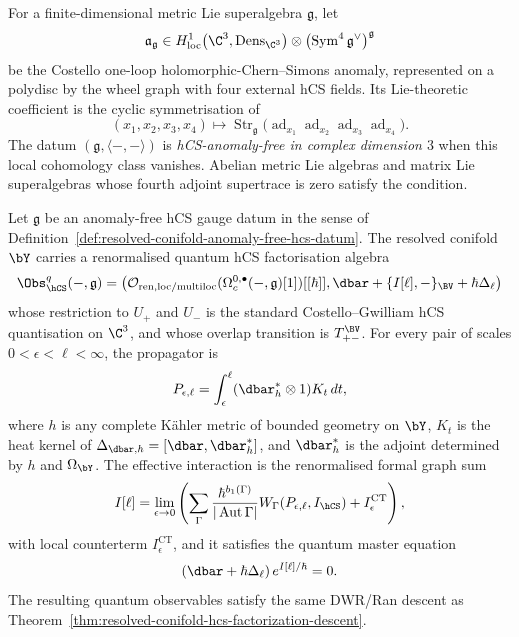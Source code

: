 \begin{definition}
\label{def:resolved-conifold-anomaly-free-hcs-datum}
For a finite-dimensional metric Lie superalgebra \(\mathfrak g\), let
\[
 \mathfrak a_{\mathfrak g}\in
 H^1_{\mathrm{loc}}\!\left(\C^3,
 \mathrm{Dens}_{\C^3}\right)
 \otimes
 \left(\operatorname{Sym}^4\mathfrak g^\vee\right)^{\mathfrak g}
\]
be the Costello one-loop holomorphic-Chern--Simons anomaly, represented
on a polydisc by the wheel graph with four external hCS fields.  Its
Lie-theoretic coefficient is the cyclic symmetrisation of
\[
 (x_1,x_2,x_3,x_4)
 \longmapsto
 \operatorname{Str}_{\mathfrak g}
 \bigl(\operatorname{ad}_{x_1}\operatorname{ad}_{x_2}
       \operatorname{ad}_{x_3}\operatorname{ad}_{x_4}\bigr).
\]
The datum \((\mathfrak g,\langle-,-\rangle)\) is
\emph{hCS-anomaly-free in complex dimension \(3\)} when this local
cohomology class vanishes.  Abelian metric Lie algebras and matrix Lie
superalgebras whose fourth adjoint supertrace is zero satisfy the
condition.
\end{definition}

\begin{theorem}
\label{thm:resolved-conifold-quantum-hcs-descent}
Let \(\mathfrak g\) be an anomaly-free hCS gauge datum in the sense of
Definition~\ref{def:resolved-conifold-anomaly-free-hcs-datum}.  The
resolved conifold \(\bY\) carries a renormalised quantum hCS
factorisation algebra
\[
 \Obs_{\hCS}^{q}(-,\mathfrak g)
 =
 \left(
 \mathcal O_{\mathrm{ren,loc/multiloc}}
   (\Omega_c^{0,\bullet}(-,\mathfrak g)[1])[[\hbar]],
 \dbar+\{I[\ell],-\}_{\BV}+\hbar\Delta_\ell
 \right)
\]
whose restriction to \(U_+\) and \(U_-\) is the standard
Costello--Gwilliam hCS quantisation on \(\C^3\), and whose overlap
transition is \(T_{+-}^{\BV}\).  For every pair of scales
\(0<\epsilon<\ell<\infty\), the propagator is
\[
 P_{\epsilon,\ell}
 =
 \int_\epsilon^\ell
 (\dbar^{*}_{h}\otimes 1)K_t\,dt,
\]
where \(h\) is any complete K\"ahler metric of bounded geometry on
\(\bY\), \(K_t\) is the heat kernel of
\(\Delta_{\dbar,h}=[\dbar,\dbar_h^*]\), and \(\dbar_h^*\) is the
adjoint determined by \(h\) and \(\Omega_{\bY}\).  The effective
interaction is the renormalised formal graph sum
\[
 I[\ell]
 =
 \lim_{\epsilon\to0}
 \left(
 \sum_{\Gamma}
 \frac{\hbar^{b_1(\Gamma)}}{|\operatorname{Aut}\Gamma|}
 W_\Gamma(P_{\epsilon,\ell},I_{\hCS})
 + I^{\mathrm{CT}}_{\epsilon}
 \right),
\]
with local counterterm \(I^{\mathrm{CT}}_{\epsilon}\), and it satisfies
the quantum master equation
\[
 \left(\dbar+\hbar\Delta_\ell\right)e^{I[\ell]/\hbar}=0.
\]
The resulting quantum observables satisfy the same DWR/Ran descent as
Theorem~\ref{thm:resolved-conifold-hcs-factorization-descent}.
\end{theorem}

